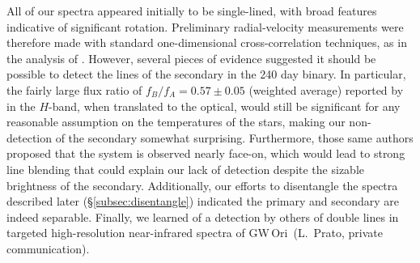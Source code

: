 \documentclass[twocolumn]{aastex61}
\newcommand{\obj}{GW\,Ori}
\begin{document}
All of our spectra appeared initially to be single-lined, with broad features indicative of significant rotation. Preliminary radial-velocity measurements were therefore made with standard one-dimensional cross-correlation techniques, as in the analysis of \cite{mathieu91}. However, several pieces of evidence suggested it should be possible to detect the lines of the secondary in the 240 day binary. In particular, the fairly large flux ratio of $f_B/f_A = 0.57 \pm 0.05$ (weighted average) reported by \cite{berger11} in the $H$-band, when translated to the optical, would still be significant for any reasonable assumption on the temperatures of the stars, making our non-detection of the secondary somewhat surprising. Furthermore, those same authors proposed that the system is observed nearly face-on, which would lead to strong line blending that could explain our lack of detection despite the sizable brightness of the secondary.
Additionally, our efforts to disentangle the spectra described later (\S\ref{subsec:disentangle}) indicated the primary and secondary are indeed separable. Finally, we learned of a detection by others of double lines in targeted high-resolution near-infrared spectra of \obj\ (L.\ Prato, private communication).
\end{document}
